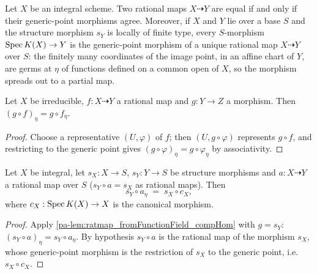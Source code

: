 \begin{theorem}
  \label{pa-thm:ratmap_functionField_correspondence}
  \mathlibok
  \leanok

  Let \(X\) be an integral scheme. Two rational maps \(X \dashrightarrow Y\) are
  equal if and only if their generic-point morphisms agree. Moreover, if \(X\)
  and \(Y\) lie over a base \(S\) and the structure morphism \(s_Y\) is locally
  of finite type, every \(S\)-morphism \(\operatorname{Spec} K(X) \to Y\) is the generic-point
  morphism of a unique rational map \(X \dashrightarrow Y\) over \(S\): the
  finitely many coordinates of the image point, in an affine chart of \(Y\), are
  germs at \(\eta\) of functions defined on a common open of \(X\), so the
  morphism spreads out to a partial map.
\end{theorem}

\begin{lemma}
  \label{pa-lem:ratmap_fromFunctionField_compHom}
  \leanok

  Let \(X\) be irreducible, \(f : X \dashrightarrow Y\) a rational map and
  \(g : Y \to Z\) a morphism. Then \((g \circ f)_\eta = g \circ f_\eta\).
\end{lemma}
\begin{proof}
  \leanok
  Choose a representative \((U, \varphi)\) of \(f\); then \((U, g \circ \varphi)\)
  represents \(g \circ f\), and restricting to the generic point gives
  \((g \circ \varphi)_\eta = g \circ \varphi_\eta\) by associativity.
\end{proof}

\begin{lemma}
  \label{pa-lem:ratmap_fromFunctionField_over}
  \leanok

  Let \(X\) be integral, let \(s_X : X \to S\), \(s_Y : Y \to S\) be structure
  morphisms and \(a : X \dashrightarrow Y\) a rational map over \(S\)
  (\(s_Y \circ a = s_X\) as rational maps). Then
  \[
    s_Y \circ a_\eta \;=\; s_X \circ c_X,
  \]
  where \(c_X : \operatorname{Spec} K(X) \to X\) is the canonical morphism.
\end{lemma}
\begin{proof}
  \leanok
  Apply \ref{pa-lem:ratmap_fromFunctionField_compHom} with \(g = s_Y\):
  \((s_Y \circ a)_\eta = s_Y \circ a_\eta\). By hypothesis \(s_Y \circ a\) is the
  rational map of the morphism \(s_X\), whose generic-point morphism is the
  restriction of \(s_X\) to the generic point, i.e.\ \(s_X \circ c_X\).
\end{proof}

